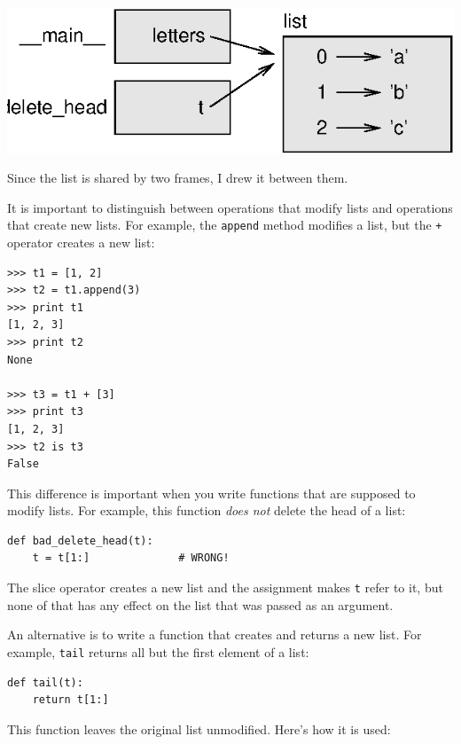 \documentclass[10pt]{book}
\begin{document}

\beforefig
\centerline{\includegraphics{figs/stack5.eps}}
\afterfig

Since the list is shared by two frames, I drew
it between them.

It is important to distinguish between operations that
modify lists and operations that create new lists.  For
example, the {\tt append} method modifies a list, but the
{\tt +} operator creates a new list:


\beforeverb
\begin{verbatim}
>>> t1 = [1, 2]
>>> t2 = t1.append(3)
>>> print t1
[1, 2, 3]
>>> print t2
None

>>> t3 = t1 + [3]
>>> print t3
[1, 2, 3]
>>> t2 is t3
False
\end{verbatim}
\afterverb

This difference is important when you write functions that
are supposed to modify lists.  For example, this function
{\em does not} delete the head of a list:

\beforeverb
\begin{verbatim}
def bad_delete_head(t):
    t = t[1:]              # WRONG!
\end{verbatim}
\afterverb

The slice operator creates a new list and the assignment
makes {\tt t} refer to it, but none of that has any effect
on the list that was passed as an argument.


An alternative is to write a function that creates and
returns a new list.  For
example, {\tt tail} returns all but the first
element of a list:

\beforeverb
\begin{verbatim}
def tail(t):
    return t[1:]
\end{verbatim}
\afterverb
%
This function leaves the original list unmodified.
Here's how it is used:
\end{document}
